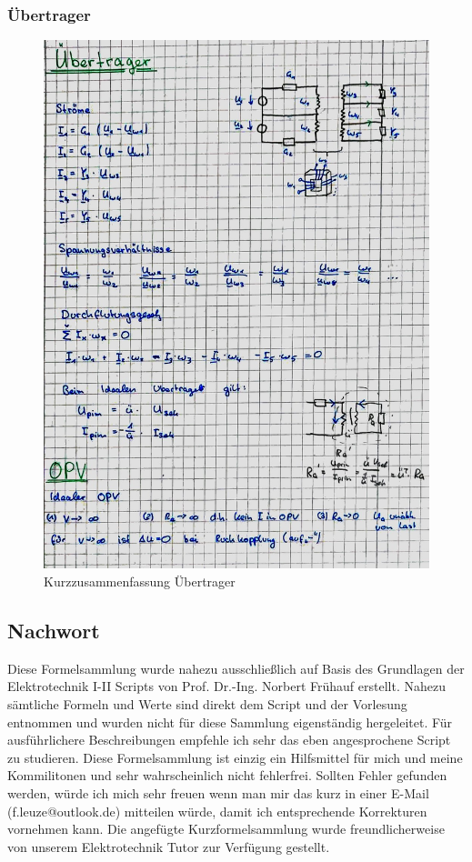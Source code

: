 \documentclass[12pt,a4paper]{article}%
\numberwithin{equation}{section}
\numberwithin{equation}{subsection}
\begin{document}
  \subsubsection{Übertrager}
\begin{figure}[H] 
	  \centering
	  \includegraphics[width=1\textwidth]{8_Uebertrager.jpg}
	  \caption{Kurzzusammenfassung Übertrager}
	  \label{fig:Übertrager}
  \end{figure}
  \newpage
  \subsection{Nachwort}
  Diese Formelsammlung wurde nahezu ausschließlich auf Basis des Grundlagen der Elektrotechnik I-II Scripts von Prof. Dr.-Ing. Norbert Frühauf erstellt. Nahezu sämtliche Formeln und Werte sind direkt dem Script und der Vorlesung entnommen und wurden nicht für diese Sammlung eigenständig hergeleitet. Für ausführlichere Beschreibungen empfehle ich sehr das eben angesprochene Script zu studieren. Diese Formelsammlung ist einzig ein Hilfsmittel für mich und meine Kommilitonen und sehr wahrscheinlich nicht fehlerfrei. Sollten Fehler gefunden werden, würde ich mich sehr freuen wenn man mir das kurz in einer E-Mail (f.leuze@outlook.de) mitteilen würde, damit ich entsprechende Korrekturen vornehmen kann. Die angefügte Kurzformelsammlung wurde freundlicherweise von unserem Elektrotechnik Tutor zur Verfügung gestellt.
  
%
\end{document}
